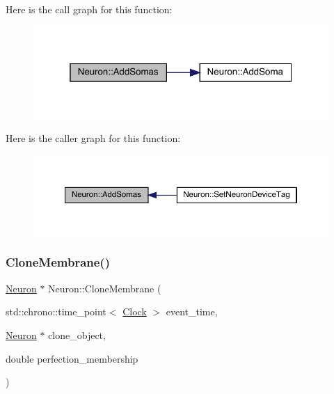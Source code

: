 Here is the call graph for this function\+:
\nopagebreak
\begin{figure}[H]
\begin{center}
\leavevmode
\includegraphics[width=319pt]{class_neuron_a78a0f48a669b6ea20280829304e51de2_cgraph}
\end{center}
\end{figure}
Here is the caller graph for this function\+:
\nopagebreak
\begin{figure}[H]
\begin{center}
\leavevmode
\includegraphics[width=350pt]{class_neuron_a78a0f48a669b6ea20280829304e51de2_icgraph}
\end{center}
\end{figure}
\mbox{\label{class_neuron_ab85f7c42466657095efb3aca5a9ee71d}} 
\subsubsection{\texorpdfstring{Clone\+Membrane()}{CloneMembrane()}}
{\footnotesize\ttfamily \hyperlink{class_neuron}{Neuron} $\ast$ Neuron\+::\+Clone\+Membrane (\begin{DoxyParamCaption}\item[{std\+::chrono\+::time\+\_\+point$<$ \hyperlink{universe_8h_a0ef8d951d1ca5ab3cfaf7ab4c7a6fd80}{Clock} $>$}]{event\+\_\+time,  }\item[{\hyperlink{class_neuron}{Neuron} $\ast$}]{clone\+\_\+object,  }\item[{double}]{perfection\+\_\+membership }\end{DoxyParamCaption})}



